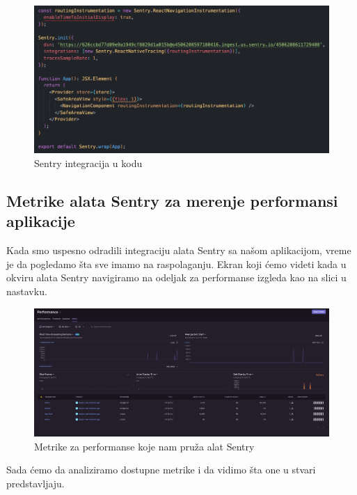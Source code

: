 \documentclass[12pt,oneside]{memoir}
\begin{document}
\begin{figure}[h]
    \centering
    \includegraphics[scale=0.5]{docs/images/chapterFive/sentryIntegration.png}
    \caption{Sentry integracija u kodu}
    \label{fig:sentryIntegration}
\end{figure}

\subsection{Metrike alata Sentry za merenje performansi aplikacije}

Kada smo uspesno odradili integraciju alata Sentry sa našom aplikacijom, vreme je da pogledamo šta sve imamo na raspolaganju. Ekran koji ćemo videti kada u okviru alata Sentry navigiramo na odeljak za performanse izgleda kao na slici u nastavku.

\begin{figure}[h]
    \centering
    \includegraphics[scale=0.2]{docs/images/chapterFive/sentryPerfMetrics.png}
    \caption{Metrike za performanse koje nam pruža alat Sentry}
    \label{fig:sentryMetrics}
\end{figure}

Sada ćemo da analiziramo dostupne metrike i da vidimo šta one u stvari predstavljaju.
\end{document}
